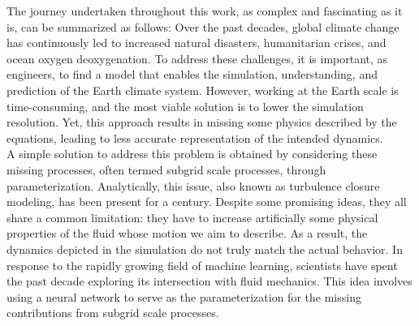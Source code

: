 %
\newpage



\setlength{\parindent}{0pt}

The journey undertaken throughout this work, as complex and fascinating as it is, can be summarized as follows: Over the past decades, global climate change has continuously led to increased natural disasters, humanitarian crises, and ocean oxygen deoxygenation. To address these challenges, it is important, as engineers, to find a model that enables the simulation, understanding, and prediction of the Earth climate system. However, working at the Earth scale is time-consuming, and the most viable solution is to lower the simulation resolution. Yet, this approach results in missing some physics described by the equations, leading to less accurate representation of the intended dynamics.\\

A simple solution to address this problem is obtained by considering these missing processes, often termed subgrid scale processes, through parameterization. Analytically, this issue, also known as turbulence closure modeling, has been present for a century. Despite some promising ideas, they all share a common limitation: they have to increase artificially some physical properties of the fluid whose motion we aim to describe. As a result, the dynamics depicted in the simulation do not truly match the actual behavior. In response to the rapidly growing field of machine learning, scientists have spent the past decade exploring its intersection with fluid mechanics. This idea involves using a neural network to serve as the parameterization for the missing contributions from subgrid scale processes.\\ 

